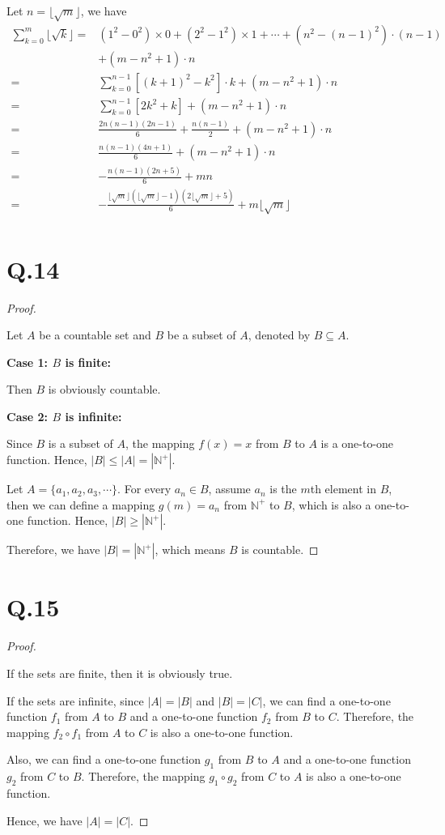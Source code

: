\documentclass[a4paper,12pt]{article}
\begin{document}
Let $n = \lfloor \sqrt{m} \rfloor$, we have
\begin{align*}
	\sum_{k = 0}^{m} \lfloor \sqrt{k} \rfloor =& (1^2 - 0^2) \times 0 + (2^2 - 1^2) \times 1 + \cdots + (n^2 - (n-1)^2) \cdot (n - 1)\\
	 &+ (m - n^2 + 1) \cdot n\\
	=& \sum_{k = 0}^{n - 1} [(k+1)^2 - k^2] \cdot k + (m - n^2 + 1) \cdot n\\
	=& \sum_{k = 0}^{n - 1} [2k^2 + k] + (m - n^2 + 1) \cdot n\\
	=& \frac{2n(n-1)(2n-1)}{6} + \frac{n(n-1)}{2} + (m - n^2 + 1) \cdot n\\
	=& \frac{n(n-1)(4n+1)}{6} + (m - n^2 + 1) \cdot n\\
	=& -\frac{n(n-1)(2n+5)}{6} + mn\\
	=& -\frac{\lfloor \sqrt{m} \rfloor(\lfloor \sqrt{m} \rfloor-1)(2\lfloor \sqrt{m} \rfloor+5)}{6} + m\lfloor \sqrt{m} \rfloor\\
\end{align*}

\section*{Q.14}
\begin{proof}
$ $

Let $A$ be a countable set and $B$ be a subset of $A$, denoted by $B \subseteq A$.

\textbf{Case 1: $B$ is finite:} 

Then $B$ is obviously countable.

\textbf{Case 2: $B$ is infinite:} 

Since $B$ is a subset of $A$, the mapping $f(x) = x$ from $B$ to $A$ is a one-to-one function.
Hence, $|B| \leq |A| = |\mathbb{N}^+|$. 

Let $A = \{a_1, a_2, a_3, \cdots\}$.
For every $a_n \in B$, assume $a_n$ is the $m$th element in $B$, then we can define a mapping $g(m) = a_n$ from $\mathbb{N^+}$ to $B$, which is also a one-to-one function.
Hence, $|B| \geq |\mathbb{N}^+|$.

Therefore, we have $|B| = |\mathbb{N}^+|$, which means $B$ is countable.
\end{proof}

\section*{Q.15}
\begin{proof}
$ $

If the sets are finite, then it is obviously true.

If the sets are infinite, since $|A| = |B|$ and $|B| = |C|$, we can find a one-to-one function $f_1$ from $A$ to $B$ and a one-to-one function $f_2$ from $B$ to $C$.
Therefore, the mapping $f_2 \circ f_1$ from $A$ to $C$ is also a one-to-one function.

Also, we can find a one-to-one function $g_1$ from $B$ to $A$ and a one-to-one function $g_2$ from $C$ to $B$.
Therefore, the mapping $g_1 \circ g_2$ from $C$ to $A$ is also a one-to-one function.

Hence, we have $|A| = |C|$.
\end{proof}
\end{document}
